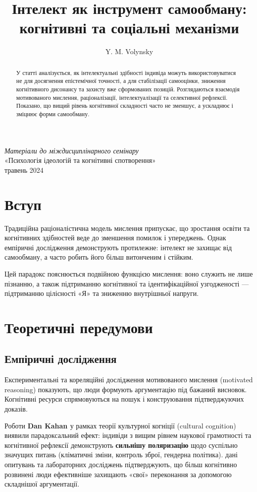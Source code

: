 \documentclass[12pt,a4paper]{article}
\title{Інтелект як інструмент самообману: когнітивні та соціальні механізми}
\author{Y. M. Volynsky}
\date{}
\begin{document}
\maketitle
\vspace{1.5em}
\begin{center}
\footnotesize
\textit{Матеріали до міждисциплінарного семінару}\\
«Психологія ідеологій та когнітивні спотворення»\\
травень 2024
\end{center}
\begin{abstract}
У статті аналізується, як інтелектуальні здібності індивіда можуть використовуватися не для досягнення епістемічної точності, а для стабілізації самооцінки, зниження когнітивного дисонансу та захисту вже сформованих позицій. Розглядаються взаємодія мотивованого мислення, раціоналізації, інтелектуалізації та селективної рефлексії. Показано, що вищий рівень когнітивної складності часто не зменшує, а ускладнює і зміцнює форми самообману.
\end{abstract}

\section{Вступ}
Традиційна раціоналістична модель мислення припускає, що зростання освіти та когнітивних здібностей веде до зменшення помилок і упереджень. Однак емпіричні дослідження демонструють протилежне: інтелект не захищає від самообману, а часто робить його більш витонченим і стійким.

Цей парадокс пояснюється подвійною функцією мислення: воно служить не лише пізнанню, а також підтриманню когнітивної та ідентифікаційної узгодженості — підтриманню цілісності «Я» та зниженню внутрішньої напруги.

\section{Теоретичні передумови}

\subsection{Емпіричні дослідження}
Експериментальні та кореляційні дослідження мотивованого мислення (motivated reasoning) показують, що люди формують аргументацію під бажаний висновок. Когнітивні ресурси спрямовуються на пошук і конструювання підтверджуючих доказів.

Роботи \textbf{Dan Kahan \cite{kahan2013}} у рамках теорії культурної когніції (cultural cognition) виявили парадоксальний ефект: індивіди з вищим рівнем наукової грамотності та когнітивної рефлексії демонструють \textbf{сильнішу поляризацію} щодо суспільно значущих питань (кліматичні зміни, контроль зброї, гендерна політика). дані опитувань та лабораторних досліджень підтверджують, що більш когнітивно розвинені люди ефективніше захищають «свої» переконання за допомогою складнішої аргументації.
\end{document}
